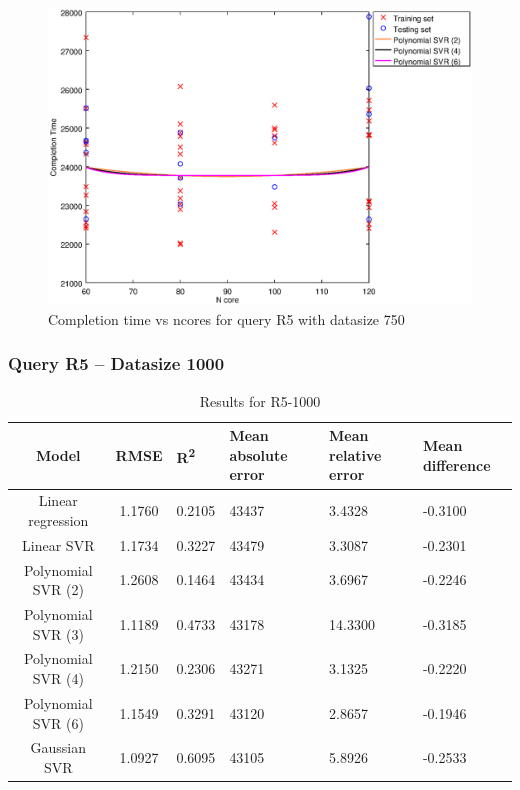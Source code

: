\documentclass[a4paper,11pt]{article}
\begin{document}
\begin {figure}[hbtp]
\centering
\includegraphics[width=\textwidth]{output/R5_750_ONLY_1_LINEAR_NCORE/plot_R5_750_bestmodels.eps}
\caption{Completion time vs ncores for query R5 with datasize 750}
\label{fig:coreonly_linear_R5_750}
\end {figure}

\newpage
\subsubsection{Query R5 -- Datasize 1000}
\begin{table}[H]
	\centering
	\begin{adjustbox}{center}
		\begin{tabular}{c | c M{1.2cm} M{2.5cm} M{2.5cm} M{1.8cm}}
			Model & RMSE & R\textsuperscript{2} & Mean absolute error & Mean relative error & Mean difference \tabularnewline
			\hline
			Linear regression & 1.1760 & 0.2105 &  43437 & 3.4328 & -0.3100 \\
			Linear SVR & 1.1734 & 0.3227 &  43479 & 3.3087 & -0.2301 \\
			Polynomial SVR (2) & 1.2608 & 0.1464 &  43434 & 3.6967 & -0.2246 \\
			Polynomial SVR (3) & 1.1189 & 0.4733 &  43178 & 14.3300 & -0.3185 \\
			Polynomial SVR (4) & 1.2150 & 0.2306 &  43271 & 3.1325 & -0.2220 \\
			Polynomial SVR (6) & 1.1549 & 0.3291 &  43120 & 2.8657 & -0.1946 \\
			Gaussian SVR & 1.0927 & 0.6095 &  43105 & 5.8926 & -0.2533 \\
		\end{tabular}
	\end{adjustbox}
	\\
	\caption{Results for R5-1000}
	\label{fig:coreonly_linear_R5_1000}
\end{table}
\end{document}
